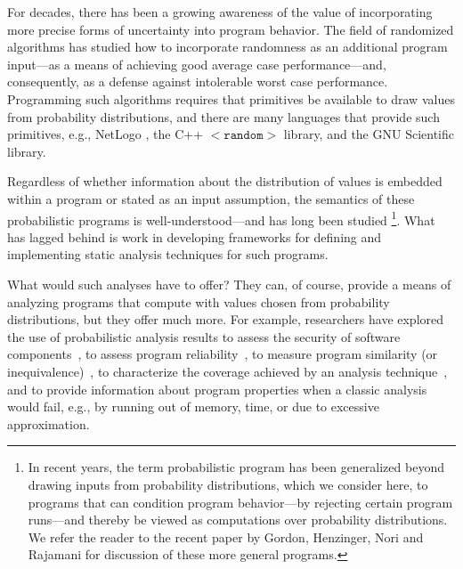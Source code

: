 For decades, there has been a growing awareness of the value of 
incorporating more precise forms of uncertainty into program behavior.  
The field of randomized algorithms has studied how to incorporate
randomness as an additional program input---as a means of achieving
good average case performance---and, consequently, as a defense against
intolerable worst case performance.
Programming such algorithms requires that primitives be available
to draw values from probability distributions, and there are many
languages that provide such primitives, e.g., NetLogo \cite{tisue2004netlogo},
the C++ \texttt{$\mathtt{<random>}$} library, and the GNU Scientific library.

Regardless of whether information about the distribution of
values is embedded within a program or stated as an input assumption,
the semantics of these probabilistic programs is well-understood---and
has long been studied 
\cite{kozen1981semantics,kozen1983probabilistic,jones1990probabilistic,morgan1996probabilistic}
\footnote{In recent
years, the term probabilistic program has been generalized beyond
drawing inputs from probability distributions, which we
consider here, to programs that can condition program behavior---by
rejecting certain program runs---and thereby be viewed as
computations over probability distributions.  We refer the reader to the
recent paper by Gordon, Henzinger, Nori and Rajamani \cite{Gordon2014}
for discussion of these more general programs.}. 
What has lagged behind is work in developing frameworks for 
defining and implementing static analysis techniques for such programs.

What would such analyses have to offer?
They can, of course, provide a means of analyzing programs that compute
with values chosen from probability distributions, but they offer much
more.
For example, researchers have explored the use of probabilistic analysis
results to assess the security of software components~\cite{mardziel2013dynamic},
to assess program reliability~\cite{Filieri2013}, to measure program
similarity (or inequivalence)~\cite{Geldenhuys2012}, 
to characterize the coverage
achieved by an analysis technique~\cite{DwyerASE11}, and to provide information
about program properties when a classic analysis would fail, e.g.,
by running out of memory, time, or due to excessive approximation.

